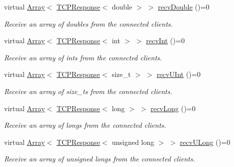 \begin{DoxyCompactItemize}
virtual \mbox{\hyperlink{class_rad_j_a_v_1_1_array}{Array}}$<$ \mbox{\hyperlink{class_rad_j_a_v_1_1_networking_1_1_t_c_p_response}{T\+C\+P\+Response}}$<$ double $>$ $>$ \mbox{\hyperlink{class_rad_j_a_v_1_1_networking_1_1_tcpip_server_a9be024d5c466e59447ef22a14884a93a}{recv\+Double}} ()=0
\begin{DoxyCompactList}\small\item\em Receive an array of doubles from the connected clients. \end{DoxyCompactList}\item 
virtual \mbox{\hyperlink{class_rad_j_a_v_1_1_array}{Array}}$<$ \mbox{\hyperlink{class_rad_j_a_v_1_1_networking_1_1_t_c_p_response}{T\+C\+P\+Response}}$<$ int $>$ $>$ \mbox{\hyperlink{class_rad_j_a_v_1_1_networking_1_1_tcpip_server_a7d84d5c0a2a8ca211b2a12c9154a7b6f}{recv\+Int}} ()=0
\begin{DoxyCompactList}\small\item\em Receive an array of ints from the connected clients. \end{DoxyCompactList}\item 
virtual \mbox{\hyperlink{class_rad_j_a_v_1_1_array}{Array}}$<$ \mbox{\hyperlink{class_rad_j_a_v_1_1_networking_1_1_t_c_p_response}{T\+C\+P\+Response}}$<$ size\+\_\+t $>$ $>$ \mbox{\hyperlink{class_rad_j_a_v_1_1_networking_1_1_tcpip_server_a359e1dbd9da88ae4f04ea9441c635518}{recv\+U\+Int}} ()=0
\begin{DoxyCompactList}\small\item\em Receive an array of size\+\_\+ts from the connected clients. \end{DoxyCompactList}\item 
virtual \mbox{\hyperlink{class_rad_j_a_v_1_1_array}{Array}}$<$ \mbox{\hyperlink{class_rad_j_a_v_1_1_networking_1_1_t_c_p_response}{T\+C\+P\+Response}}$<$ long $>$ $>$ \mbox{\hyperlink{class_rad_j_a_v_1_1_networking_1_1_tcpip_server_ac33cd6551334e7e9f01c760633bb53db}{recv\+Long}} ()=0
\begin{DoxyCompactList}\small\item\em Receive an array of longs from the connected clients. \end{DoxyCompactList}\item 
virtual \mbox{\hyperlink{class_rad_j_a_v_1_1_array}{Array}}$<$ \mbox{\hyperlink{class_rad_j_a_v_1_1_networking_1_1_t_c_p_response}{T\+C\+P\+Response}}$<$ unsigned long $>$ $>$ \mbox{\hyperlink{class_rad_j_a_v_1_1_networking_1_1_tcpip_server_a09ecfe6df6b363f17670f0dc6b52cbdd}{recv\+U\+Long}} ()=0
\begin{DoxyCompactList}\small\item\em Receive an array of unsigned longs from the connected clients. \end{DoxyCompactList}\item 

\end{DoxyCompactItemize}

